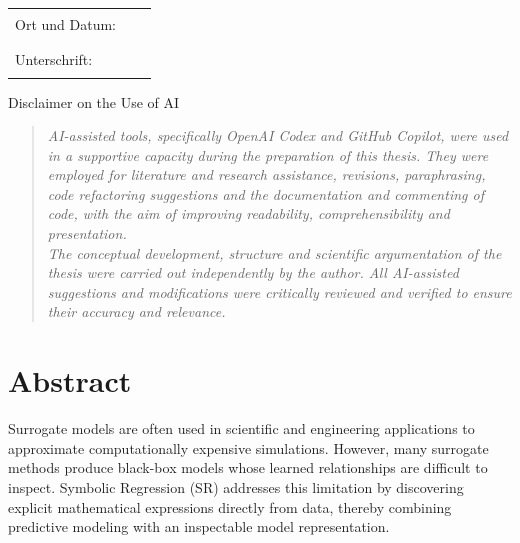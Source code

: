 \documentclass[12pt,oneside,bibtotoc,liststotoc]{scrbook}
\begin{document}
\begin{flushleft}
\begin{tabular}{lll}
Ort und Datum: & & \rule{7cm}{0.4pt}\\[7ex]
Unterschrift: & & \rule{7cm}{0.4pt}
\end{tabular}
\end{flushleft}

\thispagestyle{empty}

\newpage

\vspace*{5cm}

\begin{center}
\LARGE{Disclaimer on the Use of AI}\\
\end{center}
\vspace{1cm}


\begin{quote}
\emph{AI-assisted tools, specifically OpenAI Codex and GitHub Copilot, were used in a supportive capacity during the preparation of this thesis. They were employed for literature and research assistance, revisions, paraphrasing, code refactoring suggestions and the documentation and commenting of code, with the aim of improving readability, comprehensibility and presentation. \\The conceptual development, structure and scientific argumentation of the thesis were carried out independently by the author. All AI-assisted suggestions and modifications were critically reviewed and verified to ensure their accuracy and relevance.}
\end{quote}
\vspace{2.5cm}

\thispagestyle{empty}

\renewcommand{\baselinestretch}{1.00}\normalsize

\setcounter{page}{1}

\chapter*{Abstract}

Surrogate models are often used in scientific and engineering applications to approximate computationally expensive simulations. However, many surrogate methods produce black-box models whose learned relationships are difficult to inspect. Symbolic Regression (SR) addresses this limitation by discovering explicit mathematical expressions directly from data, thereby combining predictive modeling with an inspectable model representation.
\end{document}
